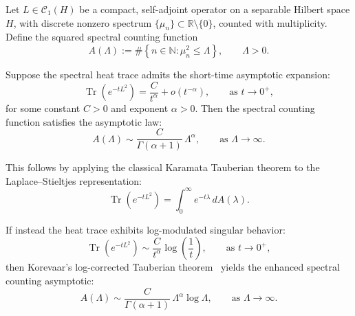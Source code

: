 \begin{definition}
\label{def:tauberian_theorem}
Let \( L \in \mathcal{C}_1(H) \) be a compact, self-adjoint operator on a separable Hilbert space \( H \), with discrete nonzero spectrum \( \{ \mu_n \} \subset \mathbb{R} \setminus \{0\} \), counted with multiplicity. Define the squared spectral counting function
\[
A(\Lambda) := \#\left\{ n \in \mathbb{N} : \mu_n^2 \le \Lambda \right\}, \qquad \Lambda > 0.
\]

Suppose the spectral heat trace admits the short-time asymptotic expansion:
\[
\operatorname{Tr}(e^{-t L^2}) = \frac{C}{t^\alpha} + o(t^{-\alpha}), \qquad \text{as } t \to 0^+,
\]
for some constant \( C > 0 \) and exponent \( \alpha > 0 \). Then the spectral counting function satisfies the asymptotic law:
\[
A(\Lambda) \sim \frac{C}{\Gamma(\alpha + 1)} \, \Lambda^\alpha, \qquad \text{as } \Lambda \to \infty.
\]

\medskip
\noindent
This follows by applying the classical Karamata Tauberian theorem to the Laplace–Stieltjes representation:
\[
\operatorname{Tr}(e^{-t L^2}) = \int_0^\infty e^{-t \lambda} \, dA(\lambda).
\]

\medskip
\noindent
If instead the heat trace exhibits log-modulated singular behavior:
\[
\operatorname{Tr}(e^{-t L^2}) \sim \frac{C}{t^\alpha} \log\left( \frac{1}{t} \right), \qquad \text{as } t \to 0^+,
\]
then Korevaar’s log-corrected Tauberian theorem~\cite[Ch.~III, §5]{Korevaar2004Tauberian} yields the enhanced spectral counting asymptotic:
\[
A(\Lambda) \sim \frac{C}{\Gamma(\alpha + 1)} \, \Lambda^\alpha \log \Lambda, \qquad \text{as } \Lambda \to \infty.
\]
\end{definition}
